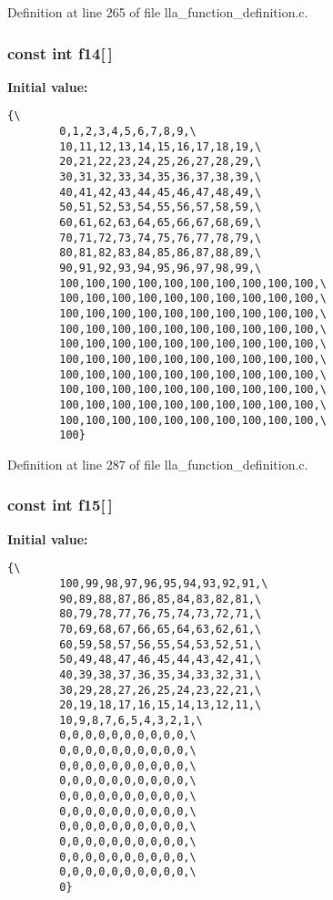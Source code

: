 Definition at line 265 of file lla\_\-function\_\-definition.c.
\subsubsection{\setlength{\rightskip}{0pt plus 5cm}const int {\bf f14}[$\,$]}\label{lla__function__definition_8c_a13}


{\bf Initial value:}

\footnotesize\begin{verbatim}{\
        0,1,2,3,4,5,6,7,8,9,\
        10,11,12,13,14,15,16,17,18,19,\
        20,21,22,23,24,25,26,27,28,29,\
        30,31,32,33,34,35,36,37,38,39,\
        40,41,42,43,44,45,46,47,48,49,\
        50,51,52,53,54,55,56,57,58,59,\
        60,61,62,63,64,65,66,67,68,69,\
        70,71,72,73,74,75,76,77,78,79,\
        80,81,82,83,84,85,86,87,88,89,\
        90,91,92,93,94,95,96,97,98,99,\
        100,100,100,100,100,100,100,100,100,100,\
        100,100,100,100,100,100,100,100,100,100,\
        100,100,100,100,100,100,100,100,100,100,\
        100,100,100,100,100,100,100,100,100,100,\
        100,100,100,100,100,100,100,100,100,100,\
        100,100,100,100,100,100,100,100,100,100,\
        100,100,100,100,100,100,100,100,100,100,\
        100,100,100,100,100,100,100,100,100,100,\
        100,100,100,100,100,100,100,100,100,100,\
        100,100,100,100,100,100,100,100,100,100,\
        100}
\end{verbatim}\normalsize 


Definition at line 287 of file lla\_\-function\_\-definition.c.
\subsubsection{\setlength{\rightskip}{0pt plus 5cm}const int {\bf f15}[$\,$]}\label{lla__function__definition_8c_a14}


{\bf Initial value:}

\footnotesize\begin{verbatim}{\
        100,99,98,97,96,95,94,93,92,91,\
        90,89,88,87,86,85,84,83,82,81,\
        80,79,78,77,76,75,74,73,72,71,\
        70,69,68,67,66,65,64,63,62,61,\
        60,59,58,57,56,55,54,53,52,51,\
        50,49,48,47,46,45,44,43,42,41,\
        40,39,38,37,36,35,34,33,32,31,\
        30,29,28,27,26,25,24,23,22,21,\
        20,19,18,17,16,15,14,13,12,11,\
        10,9,8,7,6,5,4,3,2,1,\
        0,0,0,0,0,0,0,0,0,0,\
        0,0,0,0,0,0,0,0,0,0,\
        0,0,0,0,0,0,0,0,0,0,\
        0,0,0,0,0,0,0,0,0,0,\
        0,0,0,0,0,0,0,0,0,0,\
        0,0,0,0,0,0,0,0,0,0,\
        0,0,0,0,0,0,0,0,0,0,\
        0,0,0,0,0,0,0,0,0,0,\
        0,0,0,0,0,0,0,0,0,0,\
        0,0,0,0,0,0,0,0,0,0,\
        0}
\end{verbatim}\normalsize 


